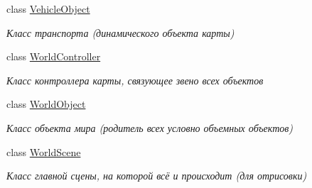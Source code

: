 \begin{DoxyCompactItemize}
class \hyperlink{classrtm_1_1_vehicle_object}{Vehicle\+Object}
\begin{DoxyCompactList}\small\item\em Класс транспорта (динамического объекта карты) \end{DoxyCompactList}\item 
class \hyperlink{classrtm_1_1_world_controller}{World\+Controller}
\begin{DoxyCompactList}\small\item\em Класс контроллера карты, связующее звено всех объектов \end{DoxyCompactList}\item 
class \hyperlink{classrtm_1_1_world_object}{World\+Object}
\begin{DoxyCompactList}\small\item\em Класс объекта мира (родитель всех условно объемных объектов) \end{DoxyCompactList}\item 
class \hyperlink{classrtm_1_1_world_scene}{World\+Scene}
\begin{DoxyCompactList}\small\item\em Класс главной сцены, на которой всё и происходит (для отрисовки) \end{DoxyCompactList}\end{DoxyCompactItemize}

